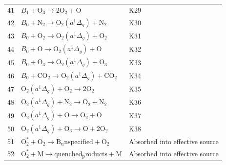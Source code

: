 \begin{longtable}{rp{}p{}}
41 & $B_1+\mathrm{O_{3}}\longrightarrow 2\mathrm{O_{2}}+\mathrm{O}$ & K29\\
42 & $B_0+\mathrm{N_{2}}\longrightarrow \mathrm{O}_2(a^1\Delta_g)+\mathrm{N_{2}}$ & K30\\
43 & $B_0+\mathrm{O_{2}}\longrightarrow \mathrm{O}_2(a^1\Delta_g)+\mathrm{O_{2}}$ & K31\\
44 & $B_0+\mathrm{O}\longrightarrow \mathrm{O}_2(a^1\Delta_g)+\mathrm{O}$ & K32\\
45 & $B_0+\mathrm{O_{3}}\longrightarrow \mathrm{O}_2(a^1\Delta_g)+\mathrm{O_{3}}$ & K33\\
46 & $B_0+\mathrm{CO_{2}}\longrightarrow \mathrm{O}_2(a^1\Delta_g)+\mathrm{CO_{2}}$ & K34\\
47 & $\mathrm{O}_2(a^1\Delta_g)+\mathrm{O_{2}}\longrightarrow 2\mathrm{O_{2}}$ & K35\\
48 & $\mathrm{O}_2(a^1\Delta_g)+\mathrm{N_{2}}\longrightarrow \mathrm{O_{2}}+\mathrm{N_{2}}$ & K36\\
49 & $\mathrm{O}_2(a^1\Delta_g)+\mathrm{O}\longrightarrow \mathrm{O_{2}}+\mathrm{O}$ & K37\\
50 & $\mathrm{O}_2(a^1\Delta_g)+\mathrm{O_{3}}\longrightarrow \mathrm{O}+2\mathrm{O_{2}}$ & K38\\
51 & $\mathrm{O}_2^*+\mathrm{O_{2}}\longrightarrow \mathrm{B_unspecified}+\mathrm{O_{2}}$ & Absorbed into effective source\\
52 & $\mathrm{O}_2^*+\mathrm{M}\longrightarrow \mathrm{quenched_products}+\mathrm{M}$ & Absorbed into effective source\\
\end{longtable}
